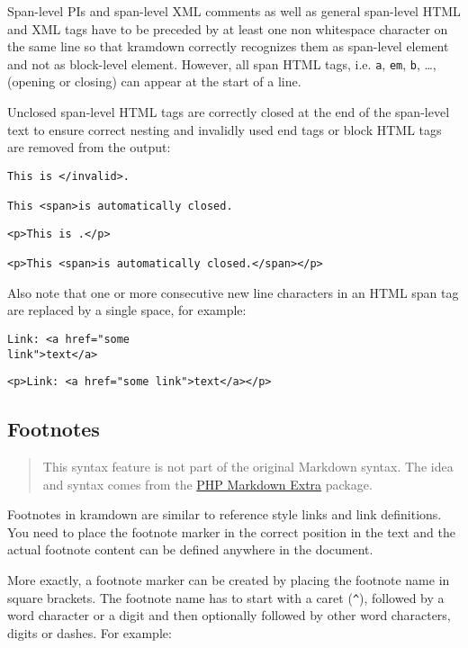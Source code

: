 \documentclass[a4paper]{article}
\begin{document}
Span-level PIs and span-level XML comments as well as general span-level
HTML and XML tags have to be preceded by at least one non whitespace
character on the same line so that kramdown correctly recognizes them as
span-level element and not as block-level element. However, all span
HTML tags, i.e. \texttt{a}, \texttt{em}, \texttt{b}, \ldots{}, (opening
or closing) can appear at the start of a line.

Unclosed span-level HTML tags are correctly closed at the end of the
span-level text to ensure correct nesting and invalidly used end tags or
block HTML tags are removed from the output:

\begin{verbatim}
This is </invalid>.

This <span>is automatically closed.
\end{verbatim}

\begin{verbatim}
<p>This is .</p>

<p>This <span>is automatically closed.</span></p>
\end{verbatim}

Also note that one or more consecutive new line characters in an HTML
span tag are replaced by a single space, for example:

\begin{verbatim}
Link: <a href="some
link">text</a>
\end{verbatim}

\begin{verbatim}
<p>Link: <a href="some link">text</a></p>
\end{verbatim}

\hypertarget{footnotes}{\subsection{Footnotes}\label{footnotes}}

\begin{quote}
This syntax feature is not part of the original Markdown syntax. The
idea and syntax comes from the
\href{http://michelf.com/projects/php-markdown/extra/}{PHP Markdown
Extra} package.
\end{quote}

Footnotes in kramdown are similar to reference style links and link
definitions. You need to place the footnote marker in the correct
position in the text and the actual footnote content can be defined
anywhere in the document.

More exactly, a footnote marker can be created by placing the footnote
name in square brackets. The footnote name has to start with a caret
(\texttt{\^{}}), followed by a word character or a digit and then
optionally followed by other word characters, digits or dashes. For
example:
\end{document}
